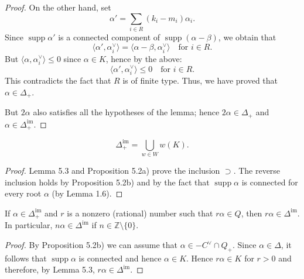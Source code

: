 \documentclass[12pt]{article}
\begin{document}
\begin{proof}
    On the other hand, set
    \[
        \alpha' = \sum_{i \in R} (k_i - m_i)\alpha_i.
    \]
    Since $\operatorname{supp}\alpha'$ is a connected component of $\operatorname{supp}(\alpha-\beta)$,
    we obtain that
    \[
        \langle \alpha', \alpha_i^\vee \rangle
        = \langle \alpha - \beta, \alpha_i^\vee \rangle \quad \text{for $i \in R$.}
    \]
    But $\langle \alpha, \alpha_i^\vee \rangle \leq 0$ since $\alpha \in K$, hence by the above:
    \[
        \langle \alpha', \alpha_i^\vee \rangle \leq 0 \quad \text{for $i \in R$.}
    \]
    This contradicts the fact that $R$ is of finite type. Thus, we have proved that
    $\alpha \in \Delta_+$.

    But $2\alpha$ also satisfies all the hypotheses of the lemma; hence $2\alpha \in \Delta_+$ and $\alpha \in \Delta^{\mathrm{im}}_+$.
\end{proof}

\begin{theorem}\label{thm:imaginary-orbits}
    \[
        \Delta^{\mathrm{im}}_+ = \bigcup_{w \in W} w(K).
    \]
\end{theorem}

\begin{proof}
    Lemma 5.3 and Proposition 5.2a) prove the inclusion $\supset$. The reverse
    inclusion holds by Proposition 5.2b) and by the fact that $\operatorname{supp}\alpha$
    is connected for every root $\alpha$ (by Lemma 1.6).
\end{proof}


\begin{proposition}\label{prop:multiples-imaginary}
    If $\alpha \in \Delta^{\mathrm{im}}_+$ and $r$ is a nonzero (rational) number
    such that $r\alpha \in Q$, then $r\alpha \in \Delta^{\mathrm{im}}$.
    In particular, $n\alpha \in \Delta^{\mathrm{im}}$ if $n \in \mathbb{Z}\setminus\{0\}$.
\end{proposition}

\begin{proof}
    By Proposition 5.2b) we can assume that $\alpha \in -C^\vee \cap Q_+$. Since
    $\alpha \in \Delta$, it follows that $\operatorname{supp}\alpha$ is connected
    and hence $\alpha \in K$. Hence $r\alpha \in K$ for $r>0$ and therefore, by Lemma 5.3,
    $r\alpha \in \Delta^{\mathrm{im}}$.
\end{proof}
\end{document}
